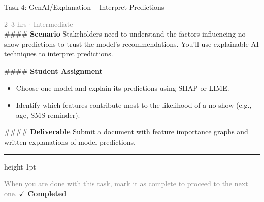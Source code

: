 \documentclass[10pt,a4paper]{article}
\begin{document}
\begin{taskbox}{Task 4: GenAI/Explanation – Interpret Predictions}

    {\small \textcolor{gray}{2--3 hrs $\cdot$ Intermediate}}\\[12pt]

    \#\#\#\# \textbf{Scenario}  
Stakeholders need to understand the factors influencing no-show predictions to trust the model's recommendations. You’ll use explainable AI techniques to interpret predictions.  

\#\#\#\# \textbf{Student Assignment}  
\begin{itemize}
    \item Choose one model and explain its predictions using SHAP or LIME.  
    \item Identify which features contribute most to the likelihood of a no-show (e.g., age, SMS reminder).  
\end{itemize}

\#\#\#\# \textbf{Deliverable}  
Submit a document with feature importance graphs and written explanations of model predictions.\par

    \vspace{16pt}

    \textcolor{cardBorder}{\hrule height 1pt}\vspace{8pt}

    \small \textcolor{gray}{When you are done with this task, mark it as complete to proceed to the next one.} \hfill \textbf{\textcolor{brandDark}{$\checkmark$ Completed}}

\end{taskbox}
\end{document}
